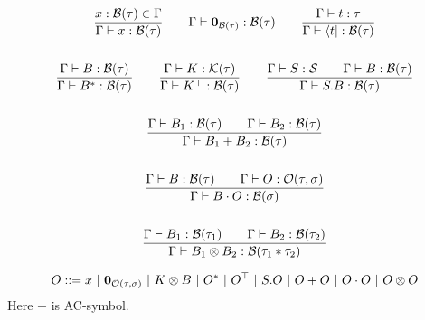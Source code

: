\begin{definition}
\begin{definition}
  \begin{gather*}
    \frac{x : \mathcal{B}(\tau) \in \Gamma}{\Gamma \vdash x : \mathcal{B}(\tau)}
    \qquad
    \Gamma \vdash \mathbf{0}_{\mathcal{B}(\tau)} : \mathcal{B}(\tau)
    \qquad
    \frac{\Gamma \vdash t : \tau}{\Gamma \vdash \langle t| : \mathcal{B}(\tau)} \\
    \\
    \frac{\Gamma \vdash B : \mathcal{B}(\tau)}{\Gamma \vdash B^* : \mathcal{B}(\tau)}
    \qquad
    \frac{\Gamma \vdash K : \mathcal{K}(\tau)}{\Gamma \vdash K^\top : \mathcal{B}(\tau)}
    \qquad
    \frac{\Gamma \vdash S : \mathcal{S} \qquad \Gamma \vdash B : \mathcal{B}(\tau)}{\Gamma \vdash S.B : \mathcal{B}(\tau)} \\
    \\
    \frac{\Gamma \vdash B_1 : \mathcal{B}(\tau) \qquad \Gamma \vdash B_2 : \mathcal{B}(\tau)}{\Gamma \vdash B_1 + B_2 : \mathcal{B}(\tau)} \\
    \\
    \frac{\Gamma \vdash B : \mathcal{B}(\tau) \qquad \Gamma \vdash O : \mathcal{O}(\tau, \sigma)}{\Gamma \vdash B \cdot O : \mathcal{B}(\sigma)} \\
    \\
    \frac{\Gamma \vdash B_1 : \mathcal{B}(\tau_1) \qquad \Gamma \vdash B_2 : \mathcal{B}(\tau_2)}{\Gamma \vdash B_1 \otimes B_2 : \mathcal{B}(\tau_1 * \tau_2)}
  \end{gather*}
\end{definition}


\begin{definition}
  \begin{align*}
    O ::= x\ |\ \zeroO{\tau, \sigma}\ |\ K \otimes B\ |\ O^*\ |\ O^\top\ |\ S.O\ |\ O + O\ |\ O \cdot O\ |\ O \otimes O
  \end{align*}
  Here $+$ is AC-symbol.
\end{definition}


\end{definition}
